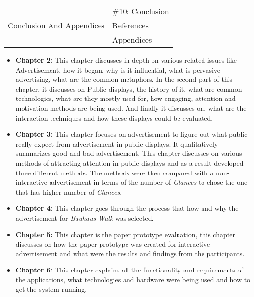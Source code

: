 \begin{table}[H]
\begin{tabular}{|c|l|}
\multirow{3}{*}{Conclusion And Appendices}    & \#10: Conclusion                                                                                            \\ \cline{2-2} 
                                              & References                                                                                                  \\ \cline{2-2} 
                                              & Appendices                                                                                                  \\ \hline
\end{tabular}
\end{table}



\begin{itemize}
\item \textbf{Chapter 2:}
 This chapter discusses in-depth on various related issues like Advertisement, how it began, why is it influential, what is pervasive advertising, what are the common metaphors. In the second part of this chapter, it discusses on Public displays, the history of it, what are common technologies, what are they mostly used for, how engaging, attention and motivation methods are being used. And finally it discusses on, what are the interaction techniques and how these displays could be evaluated.


\item \textbf{Chapter 3:}
This chapter focuses on advertisement to figure out what public really expect from advertisement in public displays. It qualitatively summarizes good and bad advertisement. This chapter discusses on various methods of attracting attention in public displays and as a result developed three different methods. The methods were then compared with a non-interactive advertisement in terms of the number of \emph{Glances} to chose the one that has higher number of \emph{Glances}.


\item \textbf{Chapter 4:}
This chapter goes through the process that how and why the advertisement for \emph{Bauhaus-Walk} was selected.


\item \textbf{Chapter 5:}
This chapter is the paper prototype evaluation, this chapter discusses on how the paper prototype was created for interactive advertisement and what were the results and findings from the participants. 


\item \textbf{Chapter 6:}
This chapter explains all the functionality and requirements of the applications, what technologies and hardware were being used and how to get the system running.



\end{itemize}
